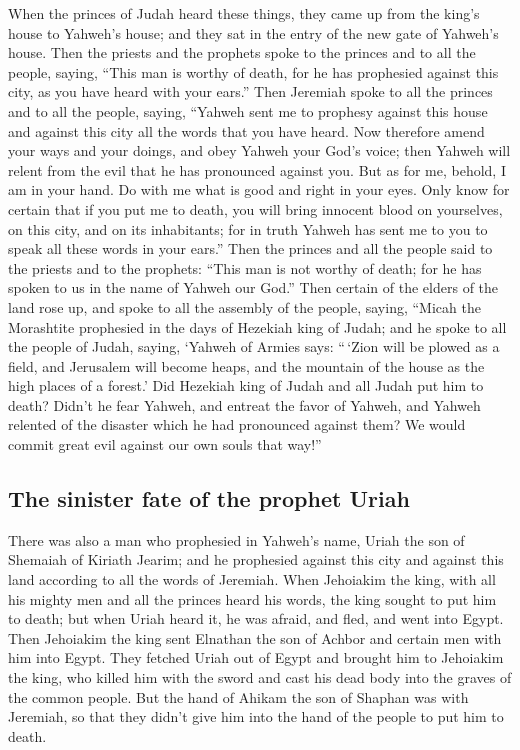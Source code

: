  When the princes of Judah heard these things, they came
up from the king's house to Yahweh's house; and they sat in the entry of
the new gate of Yahweh's house.  Then the priests and the
prophets spoke to the princes and to all the people, saying, ``This man
is worthy of death, for he has prophesied against this city, as you have
heard with your ears.''  Then Jeremiah spoke to all the
princes and to all the people, saying, ``Yahweh sent me to prophesy
against this house and against this city all the words that you have
heard.  Now therefore amend your ways and your doings,
and obey Yahweh your God's voice; then Yahweh will relent from the evil
that he has pronounced against you.  But as for me,
behold, I am in your hand. Do with me what is good and right in your
eyes.  Only know for certain that if you put me to death,
you will bring innocent blood on yourselves, on this city, and on its
inhabitants; for in truth Yahweh has sent me to you to speak all these
words in your ears.''  Then the princes and all the
people said to the priests and to the prophets: ``This man is not worthy
of death; for he has spoken to us in the name of Yahweh our God.''
 Then certain of the elders of the land rose up, and
spoke to all the assembly of the people, saying,  ``Micah
the Morashtite prophesied in the days of Hezekiah king of Judah; and he
spoke to all the people of Judah, saying, `Yahweh of Armies says:
``\,`Zion will be plowed as a field, and Jerusalem will become heaps,
and the mountain of the house as the high places of a forest.'
 Did Hezekiah king of Judah and all Judah put him to
death? Didn't he fear Yahweh, and entreat the favor of Yahweh, and
Yahweh relented of the disaster which he had pronounced against them? We
would commit great evil against our own souls that way!''

\hypertarget{the-sinister-fate-of-the-prophet-uriah}{%
\subsection{The sinister fate of the prophet
Uriah}\label{the-sinister-fate-of-the-prophet-uriah}}

 There was also a man who prophesied in Yahweh's name,
Uriah the son of Shemaiah of Kiriath Jearim; and he prophesied against
this city and against this land according to all the words of Jeremiah.
 When Jehoiakim the king, with all his mighty men and all
the princes heard his words, the king sought to put him to death; but
when Uriah heard it, he was afraid, and fled, and went into Egypt.
 Then Jehoiakim the king sent Elnathan the son of Achbor
and certain men with him into Egypt.  They fetched Uriah
out of Egypt and brought him to Jehoiakim the king, who killed him with
the sword and cast his dead body into the graves of the common people.
 But the hand of Ahikam the son of Shaphan was with
Jeremiah, so that they didn't give him into the hand of the people to
put him to death.

